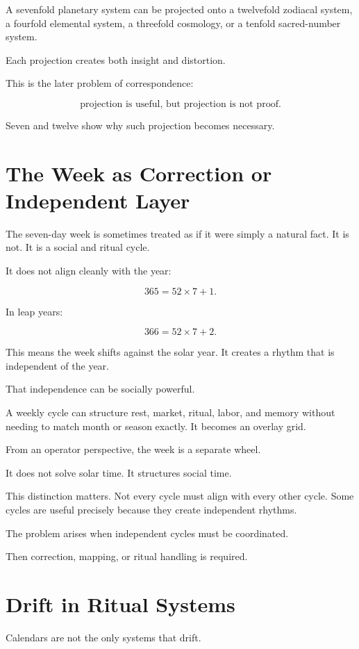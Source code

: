 \documentclass[11pt]{book}
\begin{document}
A sevenfold planetary system can be projected onto a twelvefold zodiacal system, a fourfold elemental system, a threefold cosmology, or a tenfold sacred-number system.

Each projection creates both insight and distortion.

This is the later problem of correspondence:

\[
\text{projection is useful, but projection is not proof}.
\]

Seven and twelve show why such projection becomes necessary.

\section{The Week as Correction or Independent Layer}

The seven-day week is sometimes treated as if it were simply a natural fact. It is not. It is a social and ritual cycle.

It does not align cleanly with the year:

\[
365 = 52 \times 7 + 1.
\]

In leap years:

\[
366 = 52 \times 7 + 2.
\]

This means the week shifts against the solar year. It creates a rhythm that is independent of the year.

That independence can be socially powerful.

A weekly cycle can structure rest, market, ritual, labor, and memory without needing to match month or season exactly. It becomes an overlay grid.

From an operator perspective, the week is a separate wheel.

It does not solve solar time. It structures social time.

This distinction matters. Not every cycle must align with every other cycle. Some cycles are useful precisely because they create independent rhythms.

The problem arises when independent cycles must be coordinated.

Then correction, mapping, or ritual handling is required.

\section{Drift in Ritual Systems}

Calendars are not the only systems that drift.
\end{document}
